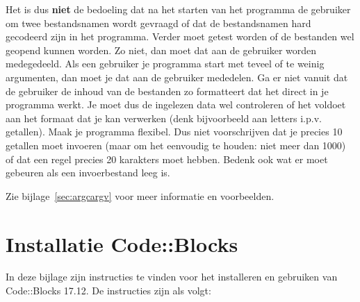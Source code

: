 \documentclass[a4paper,10pt,fleqn,twoside]{article}
\begin{document}
Het is dus \textbf{niet} de bedoeling dat na het starten van het programma de gebruiker om twee bestandsnamen wordt gevraagd of dat de bestandsnamen hard gecodeerd zijn in het programma. Verder moet getest worden of de bestanden wel geopend kunnen worden. Zo niet, dan moet dat aan de gebruiker worden medegedeeld. Als een gebruiker je programma start met teveel of te weinig argumenten, dan moet je dat aan de gebruiker mededelen. Ga er niet vanuit dat de gebruiker de inhoud van de bestanden zo formatteert dat het direct in je programma werkt. Je moet dus de ingelezen data wel controleren of het voldoet aan het formaat dat je kan verwerken (denk bijvoorbeeld aan letters i.p.v. getallen). Maak je programma flexibel. Dus niet voorschrijven dat je precies 10 getallen moet invoeren (maar om het eenvoudig te houden: niet meer dan 1000) of dat een regel precies 20 karakters moet hebben. Bedenk ook wat er moet gebeuren als een invoerbestand leeg is.

Zie bijlage~\ref{sec:argcargv} voor meer informatie en voorbeelden.


\appendix

\section{Installatie Code::Blocks}
\label{sec:installcodeblocks}

In deze bijlage zijn instructies te vinden voor het installeren en gebruiken van Code::Blocks 17.12. De instructies zijn als volgt:
\end{document}
